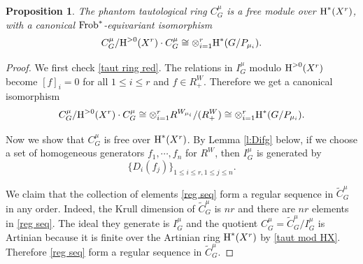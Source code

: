 \documentclass[reqno]{amsart}
\numberwithin{equation}{subsection}
\newtheorem{prop}[subsubsection]{Proposition}
\theoremstyle{definition}
\newcommand\Frob{\textup{Frob}}
\newcommand{\wt}[1]{\widetilde{#1}}
\newcommand{\cohog}[2]{\textup{H}^{#1}({#2})}     %
\begin{document}
\begin{prop}\label{p:taut ring free over HX}
    The phantom tautological ring $C^\mu_G$ is a free module over $\cohog{*}{X^r}$, with a canonical $\Frob^*$-equivariant isomorphism
    \begin{equation}\label{taut ring red}
        C^\mu_G/\cohog{>0}{X^r}\cdot C^\mu_G\cong \otimes_{i=1}^r \cohog{*}{G/P_{\mu_i}}.
    \end{equation}
\end{prop}
\begin{proof}
    We first check \eqref{taut ring red}. The relations in $I^\mu_G$ modulo $\cohog{>0}{X^r}$ become $[f]_i=0$ for all $1\le i\le r$ and $f\in R^W_{+}$. Therefore we get a canonical isomorphism
    \begin{equation}\label{taut mod HX}
        C^\mu_G/\cohog{>0}{X^r}\cdot C^\mu_G\cong \otimes_{i=1}^r R^{W_{\mu_i}}/(R^W_+)\cong\otimes_{i=1}^r \cohog{*}{G/P_{\mu_i}}.
    \end{equation}
    
    Now we show that $C^\mu_G$ is free over $\cohog{*}{X^r}$. By Lemma \ref{l:Difg} below, if we choose a set of homogeneous generators $f_1,\cdots, f_n$ for $R^W$, then $I^\mu_G$ is generated by    \begin{equation}\label{reg seq}
    \{D_i(f_j)\}_{1\le i\le r, 1\le j\le n}.
    \end{equation}
    

    We claim that the collection of elements \eqref{reg seq} form a regular sequence in $\wt C^\mu_G$ in any order. Indeed, the Krull dimension of $\wt C^\mu_G$ is $nr$ and there are $nr$ elements in \eqref{reg seq}. The ideal they generate is $I^\mu_G$ and the quotient $C^\mu_G=\wt C^\mu_G/I^\mu_G$ is Artinian because it is finite over the Artinian ring $\cohog{*}{X^r}$ by \eqref{taut mod HX}. Therefore \eqref{reg seq} form a regular sequence in $\wt C^\mu_G$.


\end{proof}
\end{document}
